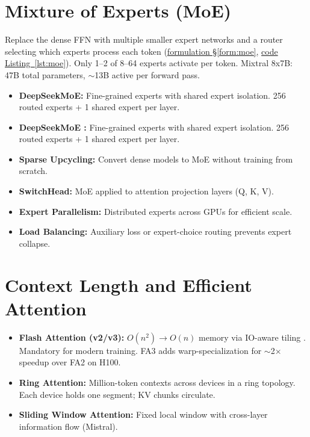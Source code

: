 \section{Mixture of Experts (MoE)}

Replace the dense FFN with multiple smaller expert networks and a router selecting which experts process each token \parencite{shazeer2017outrageously} (\hyperref[form:moe]{formulation \S\ref*{form:moe}}, \hyperref[lst:moe]{code Listing~\ref*{lst:moe}}). Only 1--2 of 8--64 experts activate per token. Mixtral 8x7B: 47B total parameters, $\sim$13B active per forward pass.

\begin{keyinsight}
\begin{itemize}
  \item \textbf{DeepSeekMoE:} Fine-grained experts with shared expert isolation. 256 routed experts + 1 shared expert per layer.
  \item \textbf{DeepSeekMoE \parencite{dai2024deepseekmoe}:} Fine-grained experts with shared expert isolation. 256 routed experts + 1 shared expert per layer.
  \item \textbf{Sparse Upcycling:} Convert dense models to MoE without training from scratch.
  \item \textbf{SwitchHead:} MoE applied to attention projection layers (Q, K, V).
  \item \textbf{Expert Parallelism:} Distributed experts across GPUs for efficient scale.
  \item \textbf{Load Balancing:} Auxiliary loss or expert-choice routing prevents expert collapse.
\end{itemize}
\end{keyinsight}

\section{Context Length and Efficient Attention}

\begin{itemize}
  \item \textbf{Flash Attention (v2/v3):} $O(n^2) \rightarrow O(n)$ memory via IO-aware tiling \parencite{dao2022flashattention,dao2023flashattention2,shah2024flashattention3}. Mandatory for modern training. FA3 adds warp-specialization for $\sim$2$\times$ speedup over FA2 on H100.
  \item \textbf{Ring Attention:} Million-token contexts across devices in a ring topology. Each device holds one segment; KV chunks circulate.
  \item \textbf{Sliding Window Attention:} Fixed local window with cross-layer information flow (Mistral).
\end{itemize}

